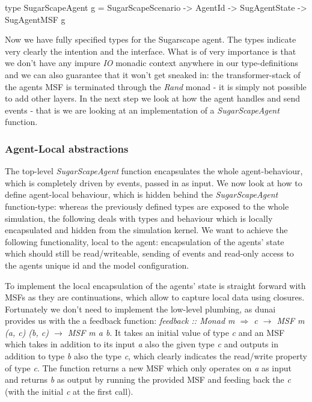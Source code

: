 \begin{HaskellCode}
type SugarScapeAgent g = SugarScapeScenario -> AgentId -> SugAgentState -> SugAgentMSF g
\end{HaskellCode}

Now we have fully specified types for the Sugarscape agent. The types indicate very clearly the intention and the interface. What is of very importance is that we don't have any impure \textit{IO} monadic context anywhere in our type-definitions and we can also guarantee that it won't get sneaked in: the transformer-stack of the agents MSF is terminated through the \textit{Rand} monad - it is simply not possible to add other layers. In the next step we look at how the agent handles and send events - that is we are looking at an implementation of a \textit{SugarScapeAgent} function.

\subsubsection{Agent-Local abstractions}
The top-level \textit{SugarScapeAgent} function encapsulates the whole agent-behaviour, which is completely driven by events, passed in as input. We now look at how to define agent-local behaviour, which is hidden behind the \textit{SugarScapeAgent} function-type: whereas the previously defined types are exposed to the whole simulation, the following deals with types and behaviour which is locally encapsulated and hidden from the simulation kernel. We want to achieve the following functionality, local to the agent: encapsulation of the agents' state which should still be read/writeable, sending of events and read-only access to the agents unique id and the model configuration.

To implement the local encapsulation of the agents' state is straight forward with MSFs as they are continuations, which allow to capture local data using closures. Fortunately we don't need to implement the low-level plumbing, as dunai provides us with the a feedback function: \textit{feedback :: Monad m $\Rightarrow$ c $\rightarrow$ MSF m (a, c) (b, c) $\rightarrow$ MSF m a b}. It takes an initial value of type \textit{c} and an MSF which takes in addition to its input \textit{a} also the given type \textit{c} and outputs in addition to type \textit{b} also the type \textit{c}, which clearly indicates the read/write property of type \textit{c}. The function returns a new MSF which only operates on \textit{a} as input and returns \textit{b} as output by running the provided MSF and feeding back the \textit{c} (with the initial \textit{c} at the first call).

